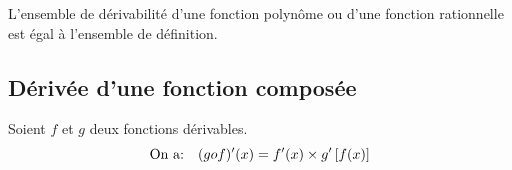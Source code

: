 \begin{remark}

 L'ensemble de dérivabilité d'une fonction polynôme ou d'une fonction rationnelle  est égal à l'ensemble de définition.
\end{remark}

\subsection{Dérivée d'une fonction composée}



\begin{theorem}

Soient   $f $ et $ g$ deux fonctions dérivables.
   \[ \text{On a:}\quad (gof)^{\prime}(x)=f^{\prime}(x)\times g^{\prime}\left[ f(x) \right]\]
\end{theorem}



